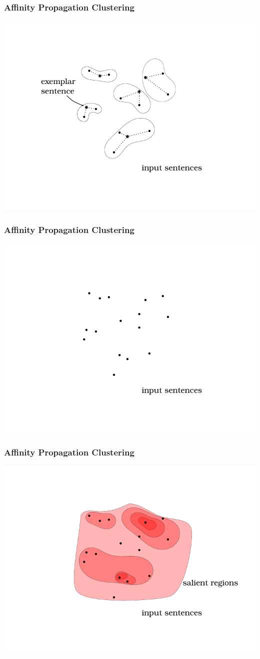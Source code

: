\documentclass{beamer}
\begin{document}
\begin{frame}
\frametitle{Affinity Propagation Clustering}
    \includegraphics{images/cluster_anim4.pdf}
\end{frame}
\begin{frame}
\frametitle{Affinity Propagation Clustering}
    \includegraphics{images/cluster_anim5.pdf}
\end{frame}
\begin{frame}
\frametitle{Affinity Propagation Clustering}
    \includegraphics{images/cluster_anim6.pdf}
\end{frame}
\end{document}
